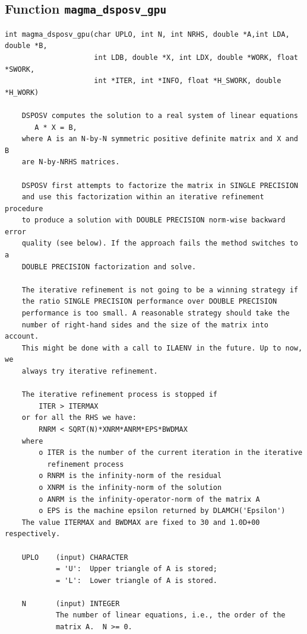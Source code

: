\documentclass[10pt]{book}
\begin{document}
\subsection{Function {\tt {\bf magma\_dsposv\_gpu}}}
\begin{verbatim}
int magma_dsposv_gpu(char UPLO, int N, int NRHS, double *A,int LDA, double *B, 
                     int LDB, double *X, int LDX, double *WORK, float *SWORK,
                     int *ITER, int *INFO, float *H_SWORK, double *H_WORK)

    DSPOSV computes the solution to a real system of linear equations
       A * X = B,
    where A is an N-by-N symmetric positive definite matrix and X and B
    are N-by-NRHS matrices.

    DSPOSV first attempts to factorize the matrix in SINGLE PRECISION
    and use this factorization within an iterative refinement procedure
    to produce a solution with DOUBLE PRECISION norm-wise backward error
    quality (see below). If the approach fails the method switches to a
    DOUBLE PRECISION factorization and solve.

    The iterative refinement is not going to be a winning strategy if
    the ratio SINGLE PRECISION performance over DOUBLE PRECISION
    performance is too small. A reasonable strategy should take the
    number of right-hand sides and the size of the matrix into account.
    This might be done with a call to ILAENV in the future. Up to now, we
    always try iterative refinement.

    The iterative refinement process is stopped if
        ITER > ITERMAX
    or for all the RHS we have:
        RNRM < SQRT(N)*XNRM*ANRM*EPS*BWDMAX
    where
        o ITER is the number of the current iteration in the iterative
          refinement process
        o RNRM is the infinity-norm of the residual
        o XNRM is the infinity-norm of the solution
        o ANRM is the infinity-operator-norm of the matrix A
        o EPS is the machine epsilon returned by DLAMCH('Epsilon')
    The value ITERMAX and BWDMAX are fixed to 30 and 1.0D+00 respectively.

    UPLO    (input) CHARACTER
            = 'U':  Upper triangle of A is stored;
            = 'L':  Lower triangle of A is stored.

    N       (input) INTEGER
            The number of linear equations, i.e., the order of the
            matrix A.  N >= 0.


\end{verbatim}
\end{document}
